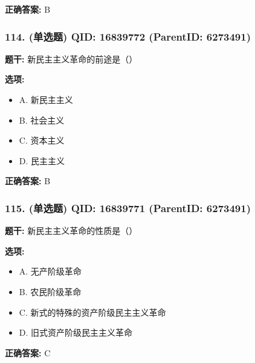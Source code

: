 \documentclass[12pt,UTF8]{ctexart}
\begin{document}
\textbf{正确答案:}
B

\vspace{0.3em}\hrulefill\vspace{0.7em}

\subsubsection*{114. (单选题) \small QID: 16839772 (ParentID: 6273491)}

\textbf{题干:}
新民主主义革命的前途是（）



\textbf{选项:}
\begin{itemize}[leftmargin=*]

  \item A. 新民主主义

  \item B. 社会主义

  \item C. 资本主义

  \item D. 民主主义

\end{itemize}

\textbf{正确答案:}
B

\vspace{0.3em}\hrulefill\vspace{0.7em}

\subsubsection*{115. (单选题) \small QID: 16839771 (ParentID: 6273491)}

\textbf{题干:}
新民主主义革命的性质是（）



\textbf{选项:}
\begin{itemize}[leftmargin=*]

  \item A. 无产阶级革命

  \item B. 农民阶级革命

  \item C. 新式的特殊的资产阶级民主主义革命

  \item D. 旧式资产阶级民主主义革命

\end{itemize}

\textbf{正确答案:}
C
\end{document}

